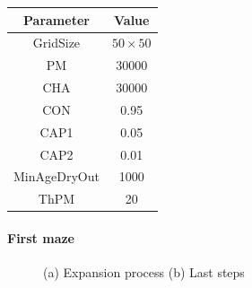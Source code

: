 \begin{center}
 \begin{tabular}{||c c||} 
 \hline
 Parameter & Value \\ [0.5ex] 
 \hline\hline
 GridSize & $50 \times 50$ \\ 
 \hline
 PM & 30000 \\ 
 \hline
 CHA & 30000 \\ 
 \hline
 CON & 0.95 \\ 
 \hline
 CAP1 & 0.05 \\ 
 \hline
 CAP2 & 0.01 \\ 
 \hline
 MinAgeDryOut & 1000 \\
 \hline
 ThPM & 20 \\ [1ex] 
 \hline
 \end{tabular}
\end{center}

\paragraph{First maze}

\begin{figure}[H]
    \centering
    \caption{(a) Expansion process (b) Last steps}
    \label{fig:foobar}
\end{figure}

